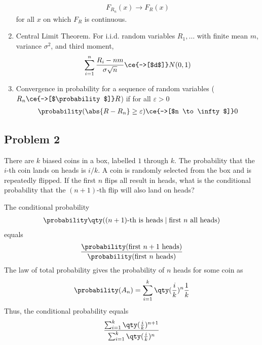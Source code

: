 \begin{solution}
\begin{enumerate}
            \begin{align}
                F_{R_n}(x) \to F_R(x)
            \end{align}
            for all $x$ on which $F_R$ is continuous.
        \item Central Limit Theorem. For i.i.d. random variables $R_1, \ldots$ with finite mean $m$, variance $\sigma^2$, and third moment,
            \begin{align}
                \sum_{i=1}^n \frac{R_i - nm}{\sigma\sqrt{n}} \ce{->[$d$]} N(0,1)
            \end{align}
        \item Convergence in probability for a sequence of random variables ($R_n \ce{->[$\probability$]} R$) if for all $\varepsilon > 0$
            \begin{align}
                \probability(\abs{R - R_n} \ge \varepsilon) \ce{->[$n \to \infty$]} 0
            \end{align}
    \end{enumerate}
\end{solution}

\subsection{Problem 2}
There are $k$ biased coins in a box, labelled $1$ through $k$. The probability that the $i$-th coin lands on heads is $i/k$. A coin is randomly selected from the box and is repeatedly flipped. If the first $n$ flips all result in heads, what is the conditional probability that the $(n+1)$-th flip will also land on heads?
\begin{solution}
    The conditional probability
    \begin{align}
        \probability\qty((n+1)\text{-th is heads} \mid \text{first $n$ all heads})
    \end{align}
    equals
    \begin{align}
        \frac{\probability(\text{first $n+1$ heads})}{\probability(\text{first $n$ heads})}
    \end{align}
    The law of total probability gives the probability of $n$ heads for some coin as
    \begin{align}
        \probability(A_n) = \sum_{i=1}^k \qty(\frac{i}{k})^n \frac{1}{k}
    \end{align}
    Thus, the conditional probability equals
    \begin{align}
        \frac{\sum_{i=1}^k \qty(\frac{i}{k})^{n+1}}{\sum_{i=1}^k \qty(\frac{i}{k})^n}
    \end{align}
\end{solution}

